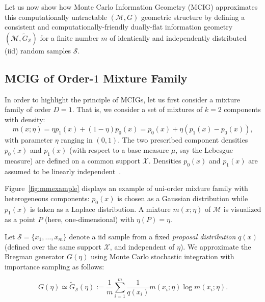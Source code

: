 \documentclass[graybox]{svmult}
\def\eqdef{:=}
\def\tildeG{\tilde{G}}
\def\calS{\mathcal{S}}
\def\calX{\mathcal{X}}
\def\calM{\mathcal{M}}
\begin{document}
Let us now show how Monte Carlo Information Geometry (MCIG) approximates this computationally untractable $(\calM,G)$ geometric structure by defining a consistent and computationally-friendly dually-flat information geometry
 $(\calM,\tildeG_\calS)$ for a finite number $m$ of  identically and independently distributed (iid) random samples $\calS$.

\subsection{MCIG of Order-$1$ Mixture Family}\label{sec:MCIGMM1D}
In order to highlight the principle of MCIGs, let us first consider a mixture family of order $D=1$.
That is, we consider a set of  mixtures of $k=2$ components with density: 
\begin{equation}
m(x;\eta)=\eta p_1(x)+(1-\eta)p_0(x)=p_0(x)+\eta(p_1(x)-p_0(x)),
\end{equation} 
with parameter $\eta$ ranging in $(0,1)$.
  The two prescribed component densities  $p_0(x)$ and $p_1(x)$ (with respect to a base measure $\mu$, say the Lebesgue measure) are defined on a common support $\calX$.
Densities $p_0(x)$ and $p_1(x)$ are assumed to be linearly independent~\cite{IG-2014}.

Figure~\ref{fig:mmexample} displays an example of uni-order mixture family with heterogeneous components: 
$p_0(x)$ is chosen as a Gaussian distribution while $p_1(x)$ is taken as a Laplace distribution.
A mixture $m(x;\eta)$ of $\calM$ is visualized as a point $P$ (here, one-dimensional) with $\eta(P)=\eta$.

Let $\calS=\{x_1,\ldots, x_m\}$ denote a iid sample from a fixed {\em
  proposal distribution} $q(x)$ (defined over the same support $\calX$, and independent of $\eta$). We approximate the  Bregman generator $G(\eta)$ using Monte Carlo stochastic integration with importance sampling as follows:

\begin{equation}\label{eq:mfag1D}
G(\eta) \simeq  \tildeG_\calS(\eta) \eqdef \frac{1}{m} \sum_{i=1}^m  \frac{1}{q(x_i)} m(x_i;\eta)\log m(x_i;\eta).
\end{equation}
\end{document}
